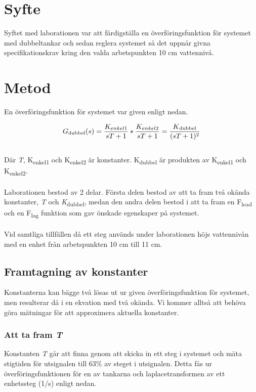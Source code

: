 \documentclass{article}
\begin{document}


\section{Syfte}
Syftet med laborationen var att färdigställa en överföringsfunktion för systemet med dubbeltankar och sedan reglera systemet så det uppnår givna specifikationskrav kring den valda arbetspunkten 10 cm vattennivå. 




\section{Metod}

En överföringsfunktion för systemet var given enligt nedan. 

\begin{equation}
G\textsubscript{dubbel}(s) = \frac{K_{enkel1}}{sT+1} * \frac{K_{enkel2}}{sT+1} = \frac{K\textsubscript{dubbel}}{(sT+1)^2}
\end{equation}
\\
Där {\itshape T}, K\textsubscript{enkel1} och K\textsubscript{enkel2} är konstanter. K\textsubscript{dubbel} är produkten av K\textsubscript{enkel1} och K\textsubscript{enkel2}. 
\\
\\
Laborationen bestod av 2 delar. Första delen bestod av att ta fram två okända konstanter, {\itshape T} och {\itshape K}\textsubscript{dubbel}, medan den andra delen bestod i att ta fram en F\textsubscript{lead} och en F\textsubscript{lag} funktion som gav önskade egenskaper på systemet. 
\\
\\
Vid samtliga tillfällen då ett steg används under laborationen höjs vattennivån med en enhet från arbetspunkten 10 cm till 11 cm.


\subsection{Framtagning av konstanter}
Konstanterna kan bägge två lösas ut ur given överföringsfunktion för systemet, men resulterar då i en ekvation med två okända. Vi kommer alltså att behöva göra mätningar för att approximera aktuella konstanter. 



\subsubsection{Att ta fram {\itshape T}}
Konstanten {\itshape T} går att finna genom att skicka in ett steg i systemet och mäta stigtiden för utsignalen till 63\% av steget i utsignalen. Detta fås ur överföringsfunktionen för en av tankarna och laplacetransformen av ett enhetssteg (1/s) enligt nedan. 
\end{document}
